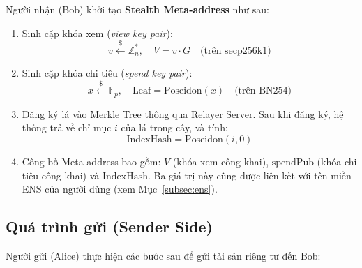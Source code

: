\documentclass[../DoAn.tex]{subfiles}
\begin{document}
Người nhận (Bob) khởi tạo \textbf{Stealth Meta-address} như sau:

\begin{enumerate}
    \item Sinh cặp khóa xem (\textit{view key pair}):
    \[
        v \xleftarrow{\$} \mathbb{Z}_n^*, \quad V = v \cdot G \quad \text{(trên secp256k1)}
    \]
    
    \item Sinh cặp khóa chi tiêu (\textit{spend key pair}):
    \[
        x \xleftarrow{\$} \mathbb{F}_p, \quad \text{Leaf} = \text{Poseidon}(x) \quad \text{(trên BN254)}
    \]
    
    \item Đăng ký lá vào Merkle Tree thông qua Relayer Server. Sau khi đăng ký, hệ thống trả về chỉ mục \(i\) của lá trong cây, và tính:
    \[
        \text{IndexHash} = \text{Poseidon}(i, 0)
    \]

    \item Công bố Meta-address bao gồm: \(V\) (khóa xem công khai), \(\text{spendPub}\) (khóa chi tiêu công khai) và \(\text{IndexHash}\). Ba giá trị này cũng được liên kết với tên miền ENS của người dùng (xem Mục~\ref{subsec:ens}).
\end{enumerate}

\subsection{Quá trình gửi (Sender Side)}
\label{subsec:sending}

Người gửi (Alice) thực hiện các bước sau để gửi tài sản riêng tư đến Bob:
\end{document}
